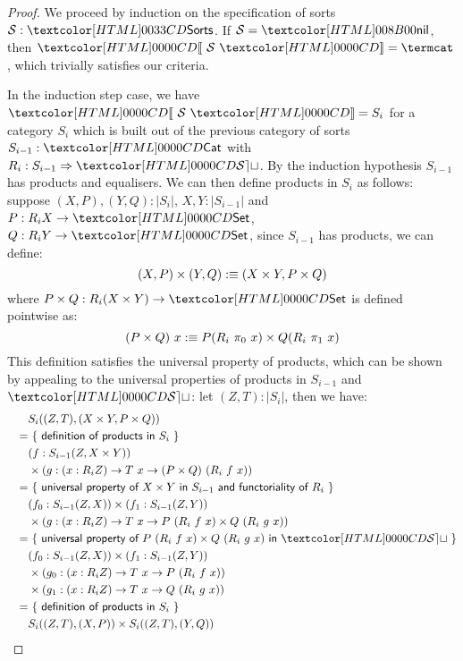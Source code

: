 \begin{proof}
  We proceed by induction on the specification of sorts
  $\Ss : \sortsty$.  If $\Ss = \sortsnil$, then $\SortCat{\Ss} = \termcat$,
  which trivially satisfies our criteria.

  In the induction step case, we have $\SortCat{\Ss} = S_i$ for a
  category $S_i$ which is built out of the previous category of sorts
  $S_{i-1} : \Cat$ with $R_i : \Func{S_{i-1}}{\SET}$. By the induction
  hypothesis $S_{i-1}$ has products and equalisers. We can then define
  products in $S_{i}$ as follows: suppose $(X,P), (Y,Q) : | S_{i} |$,
  \ie $X, Y : | S_{i-1} |$ and $P : R_i X \to \Set$,
  $Q : R_i Y \to \Set$, since $S_{i-1}$ has products, we can define:
  \[
    (X,P) \times (Y,Q) :\equiv (X \times Y , P \times Q)
  \]
  where $P \times Q : R_i (X \times Y) \to \Set$ is defined pointwise
  as:
  \[
    (P \times Q)\ x :\equiv P (R_i\ \pi_0\ x) \times Q (R_i\ \pi_1\ x)
  \]
  This definition satisfies the universal property of products, which
  can be shown by appealing to the universal properties of products in
  $S_{i-1}$ and $\SET$: let $(Z,T) : | S_{i} |$, then we have:
  \begin{align*}
    &&&S_i((Z,T),(X \times Y, P \times Q)) \\
    &&=&\ \reasontext{definition of products in $S_i$} \\
    &&& (f : S_{i-1}(Z,X \times Y)) \\
    &&& \times (g : (x : R_i Z) \to T\ x \to (P \times Q)\ (R_i\ f\ x)) \\
    &&=&\ \reasontext{universal property of $X \times Y$ in $S_{i-1}$ and functoriality of $R_i$} \\
    &&& (f_0 : S_{i-1}(Z,X)) \times (f_1 : S_{i-1}(Z,Y)) \\
    &&& \times (g : (x : R_iZ) \to T\ x \to P\ (R_i\ f\ x) \times Q\ (R_i\ g\ x)) \\
    &&=&\ \reasontext{universal property of $P\ (R_i\ f\ x) \times Q\ (R_i\ g\ x)$ in $\SET$} \\
    &&& (f_0 : S_{i-1}(Z,X)) \times (f_1 : S_{i-1}(Z,Y)) \\
    &&& \times (g_0 : (x : R_iZ) \to T\ x \to P\ (R_i\ f\ x)) \\
    &&& \times (g_1 : (x : R_iZ) \to T\ x \to Q\ (R_i\ g\ x)) \\
    &&=&\ \reasontext{definition of products in $S_i$} \\
    &&& S_i((Z,T),(X,P)) \times S_i((Z,T),(Y,Q))
  \end{align*}
\end{proof}

